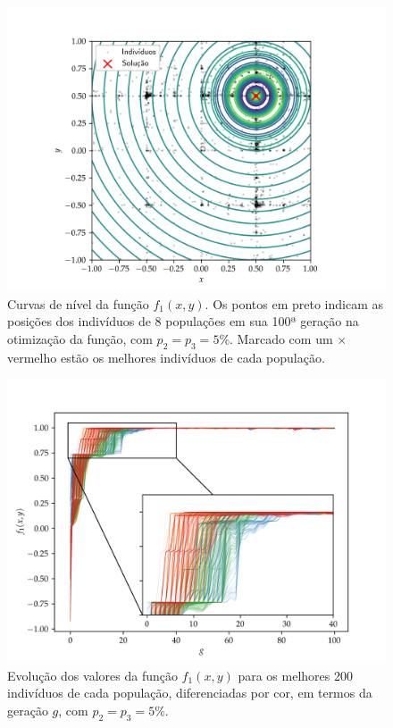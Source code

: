 \begin{figure}[p]
  \centering
  \includegraphics[width=\textwidth]{imagens/low_prob/contour_damped_cossine.png}
  \caption{
    Curvas de nível da função $f_1(x,y)$. Os pontos em preto indicam as posições dos indivíduos
    de 8 populações em sua 100ª geração na otimização da função, com $ p_2 = p_3 = 5\% $. 
    Marcado com um $\times$ vermelho estão os melhores indivíduos de cada população.
  }
  \label{fig:contour_damped_cossine}
\end{figure}

\begin{figure}[p]
  \centering
  \includegraphics[width=\textwidth]{imagens/low_prob/evolution_damped_cossine.png}
  \caption{
    Evolução dos valores da função $ f_1(x,y) $ para os
    melhores 200 indivíduos de cada população, diferenciadas por cor, em termos da geração $g$,
    com $ p_2 = p_3 = 5\% $.
  }
  \label{fig:evolution_damped_cossine}
\end{figure}

